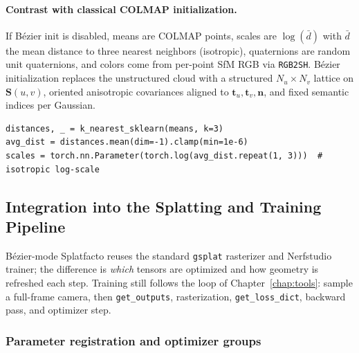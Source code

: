 \documentclass{report}
\newcommand{\filepath}[1]{\nolinkurl{#1}}
\newcommand{\code}[1]{\nolinkurl{#1}}
\begin{document}
\paragraph{Contrast with classical COLMAP initialization.}
If B\'ezier init is disabled, means are COLMAP points, scales are $\log(\bar{d})$ with $\bar{d}$ the mean distance to three nearest neighbors (isotropic), quaternions are random unit quaternions, and colors come from per-point SfM RGB via \texttt{RGB2SH}. B\'ezier initialization replaces the unstructured cloud with a structured $N_u\times N_v$ lattice on $\mathbf{S}(u,v)$, oriented anisotropic covariances aligned to $\mathbf{t}_u,\mathbf{t}_v,\mathbf{n}$, and fixed semantic indices per Gaussian.

\begin{lstlisting}[caption={Classical COLMAP scale init (fallback path, \filepath{splatfacto.py}).},label={lst:classic_scale}]
distances, _ = k_nearest_sklearn(means, k=3)
avg_dist = distances.mean(dim=-1).clamp(min=1e-6)
scales = torch.nn.Parameter(torch.log(avg_dist.repeat(1, 3)))  # isotropic log-scale
\end{lstlisting}

\subsection{Integration into the Splatting and Training Pipeline}
\label{subsec:bezier_pipeline}

B\'ezier-mode Splatfacto reuses the standard \code{gsplat} rasterizer and Nerfstudio trainer; the difference is \emph{which} tensors are optimized and how geometry is refreshed each step. Training still follows the loop of Chapter~\ref{chap:tools}: sample a full-frame camera, then \code{get\_outputs}, rasterization, \code{get\_loss\_dict}, backward pass, and optimizer step.

\subsubsection{Parameter registration and optimizer groups}
\label{subsubsec:bezier_optimizer}
\end{document}
